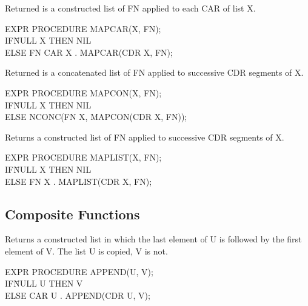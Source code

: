 \documentclass[11pt,letterpaper]{book}
\begin{document}
{Returned is a constructed list of FN applied to each CAR of list X.

{\tt \begin{tabbing} EXPR PROCEDURE MAPCAR(X, FN); \\
\hspace*{1em} IF\= NULL X THEN NIL \\
\> ELSE FN CAR X . MAPCAR(CDR X, FN);
\end{tabbing}}}


{Returned is a concatenated list of FN applied to successive CDR
segments of X.

{\tt \begin{tabbing} EXPR PROCEDURE MAPCON(X, FN); \\
\hspace*{1em} IF\= NULL X THEN NIL \\
\> ELSE NCONC(FN X, MAPCON(CDR X, FN));
\end{tabbing}}}


{Returns a constructed list of FN applied to successive CDR segments
of X.

{\tt \begin{tabbing} EXPR PROCEDURE MAPLIST(X, FN); \\
\hspace*{1em} IF\= NULL X THEN NIL \\
\> ELSE FN X . MAPLIST(CDR X, FN);
\end{tabbing}}}


\subsection{Composite Functions}

{Returns a constructed list in which the last element of U is followed
by the first element of V. The list U is copied, V is not.

{\tt \begin{tabbing} EXPR PROCEDURE APPEND(U, V); \\
\hspace*{1em} IF\= NULL U THEN V \\
\> ELSE CAR U . APPEND(CDR U, V);
\end{tabbing}}}
\end{document}
